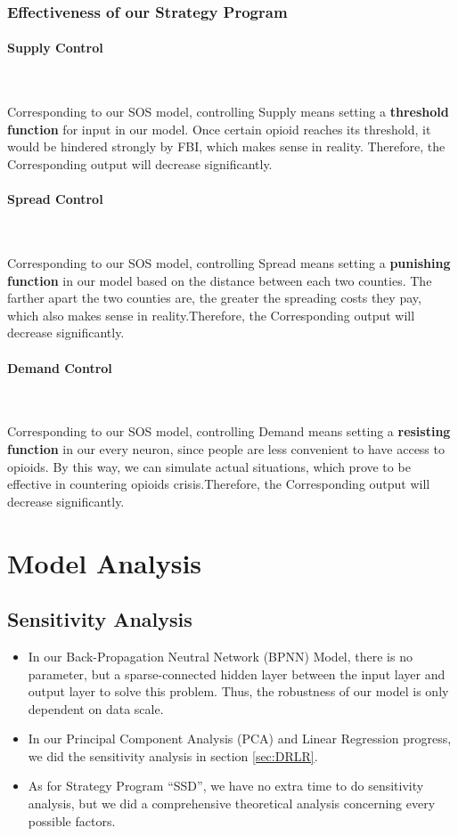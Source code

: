 \documentclass{mcmthesis}
\begin{document}
\subsubsection{Effectiveness of our Strategy Program}
\paragraph{\textbf{Supply Control}}

~\smallskip

Corresponding to our SOS model, controlling Supply means setting a \textbf{threshold function} for input in our model. Once certain opioid reaches its threshold, it would be hindered strongly by FBI, which makes sense in reality. Therefore, the Corresponding output will decrease significantly.
\paragraph{\textbf{Spread Control}}

~\smallskip

Corresponding to our SOS model, controlling Spread means setting a \textbf{punishing function }in our model based on the distance between each two counties. The farther apart the two counties are, the greater the spreading costs they pay, which also makes sense in reality.Therefore, the Corresponding output will decrease significantly.
\paragraph{\textbf{Demand Control}}

~\smallskip

Corresponding to our SOS model, controlling Demand means setting a \textbf{resisting function} in our every neuron, since people are less convenient to have access to opioids. By this way, we can simulate actual situations, which prove to be effective in countering opioids crisis.Therefore, the Corresponding output will decrease significantly.
\section{Model Analysis}\label{Sec-Analysis}

\subsection{Sensitivity Analysis}
\begin{itemize}
    \item In our Back-Propagation Neutral Network (BPNN) Model, there is no parameter, but a sparse-connected hidden layer between the input layer and output layer to solve this problem. Thus, the robustness of our model is only dependent on data scale.
    \item In our Principal Component Analysis (PCA) and Linear Regression progress, we did the sensitivity analysis in section \ref{sec:DRLR}.
    \item As for Strategy Program ``SSD'', we have no extra time to do sensitivity analysis, but we did a comprehensive theoretical analysis concerning every possible factors.
\end{itemize}
\end{document}
